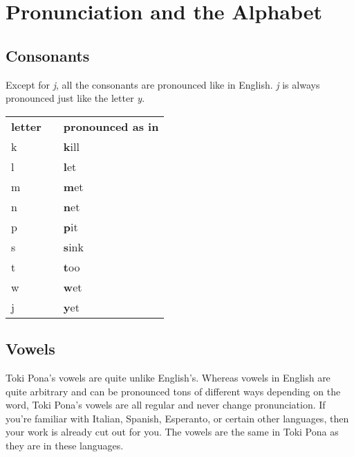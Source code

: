 \label{'pronunciation_alphabet'}
\section{Pronunciation and the Alphabet}
%
\subsection*{Consonants}
%
Except for \textit{j}, all the consonants are pronounced like in English. 
\textit{j} is always pronounced just like the letter \textit{y}. 

\begin{supertabular}{p{2,5cm}|ll}
\textbf{letter}   &&    \textbf{pronounced as in} \\ %
k && \textbf{k}ill \\ %
l && \textbf{l}et \\ %
m && \textbf{m}et \\ %
n && \textbf{n}et \\ %
p && \textbf{p}it \\ %
s && \textbf{s}ink \\ %
t && \textbf{t}oo \\ %
w && \textbf{w}et \\ %
j && \textbf{y}et \\ %
\end{supertabular} 

\subsection*{Vowels}
%
Toki Pona's vowels are quite unlike English's. Whereas vowels in English are quite arbitrary and can be pronounced tons of different ways depending on the word, Toki Pona's vowels are all regular and never change pronunciation. 
If you're familiar with Italian, Spanish, Esperanto, or certain other languages, then your work is already cut out for you. The vowels are the same in Toki Pona as they are in these languages. 

